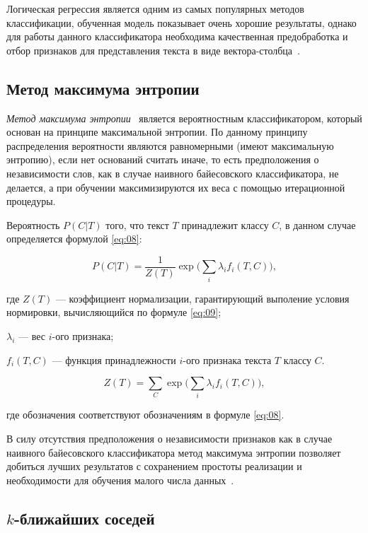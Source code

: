 Логическая регрессия является одним из самых популярных методов классификации,
обученная модель показывает очень хорошие результаты, однако для работы
данного классификатора необходима качественная предобработка и отбор
признаков для представления текста в виде вектора-столбца~\cite{article9}.

\subsection{Метод максимума энтропии}

\textit{Метод максимума энтропии}~\cite{article23} является вероятностным
классификатором, который основан на принципе максимальной энтропии. По данному
принципу распределения вероятности являются равномерными (имеют максимальную
энтропию), если нет оснований считать иначе, то есть предположения о
независимости слов, как в случае наивного байесовского классификатора, не
делается, а при обучении максимизируются их веса с помощью итерационной
процедуры.

Вероятность $P(C|T)$ того, что текст $T$ принадлежит классу $C$, в данном случае
определяется формулой \ref{eq:08}:

\begin{equation}\label{eq:08}
    P(C|T) = \frac{1}{Z(T)}\exp\Big(\sum_i \lambda_i f_i(T, C)\Big),
\end{equation}

где $Z(T)$ --- коэффициент нормализации, гарантирующий выполение условия
нормировки, вычисляющийся по формуле \ref{eq:09};

$\lambda_i$ --- вес $i$-ого признака;

$f_i(T, C)$ --- функция принадлежности $i$-ого признака текста $T$ классу
$C$.

\begin{equation}\label{eq:09}
    Z(T) = \sum_C\exp\Big(\sum_i \lambda_i f_i(T, C)\Big),
\end{equation}

где обозначения соответствуют обозначениям в формуле \ref{eq:08}.

В силу отсутствия предположения о независимости признаков как в
случае наивного байесовского классификатора метод максимума энтропии
позволяет добиться лучших результатов с сохранением простоты реализации и
необходимости для обучения малого числа данных~\cite{article9}.

\subsection{$k$-ближайших соседей}

